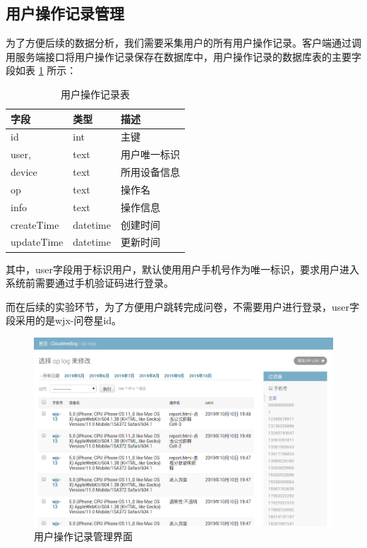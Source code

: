 \subsection{用户操作记录管理}
为了方便后续的数据分析，我们需要采集用户的所有用户操作记录。客户端通过调用服务端接口将用户操作记录保存在数据库中，用户操作记录的数据库表的主要字段如表 \ref{tab:op_log} 所示：

\begin{table}[]
    \centering
    \begin{tabular}{lll}
        \toprule
        字段 & 类型 & 描述 \\ 
        \midrule
        id & int & 主键 \\
        user, & text & 用户唯一标识 \\ 
        device & text & 所用设备信息 \\
        op & text & 操作名 \\
        info & text & 操作信息 \\
        createTime & datetime & 创建时间 \\
        updateTime & datetime & 更新时间\\
        \bottomrule
    \end{tabular}
    \caption{用户操作记录表}
    \label{tab:op_log}
\end{table}


其中，user字段用于标识用户，默认使用用户手机号作为唯一标识，要求用户进入系统前需要通过手机验证码进行登录。


而在后续的实验环节，为了方便用户跳转完成问卷，不需要用户进行登录，user字段采用的是wjx-问卷星id。

\begin{figure}[ht]
    \centering
    \includegraphics[width=12cm]{images/op_log.png}
    \caption{用户操作记录管理界面}
    \label{fig:op_log}
\end{figure}

